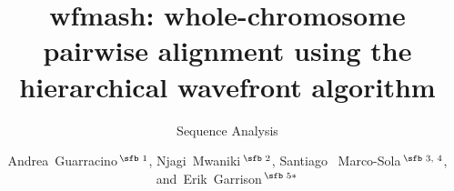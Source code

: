\documentclass{bioinfo}
\begin{document}

\subtitle{Sequence Analysis}

\title[wfmash: whole-cromosome pairwise aligner]{wfmash: whole-chromosome pairwise alignment using the hierarchical wavefront algorithm}
\author[Guarracino \textit{et~al}.]{
Andrea~Guarracino\,$^{\text{\sfb 1}}$,
Njagi~Mwaniki\,$^{\text{\sfb 2}}$,
Santiago~ Marco-Sola\,$^{\text{\sfb 3, 4}}$,
and~Erik~Garrison\,$^{\text{\sfb 5}*}$
}

\address{
$^{\text{\sf 1}}$Genomics Research Centre, Human Technopole, Milan, Italy \\
$^{\text{\sf 2}}$Department of Computer Sciences, University of Pisa, Pisa, Italy \\
$^{\text{\sf 3}}$Department of Computer Sciences, Barcelona Supercomputing Center, Barcelona 08034, Spain \\
$^{\text{\sf 4}}$Departament d’Arquitectura de Computadors i Sistemes Operatius, Universitat Autònoma de Barcelona, Barcelona 08193, Spain \\
$^{\text{\sf 5}}$University of Tennessee Health Science Center, Memphis, TN, USA
}





\end{document}
